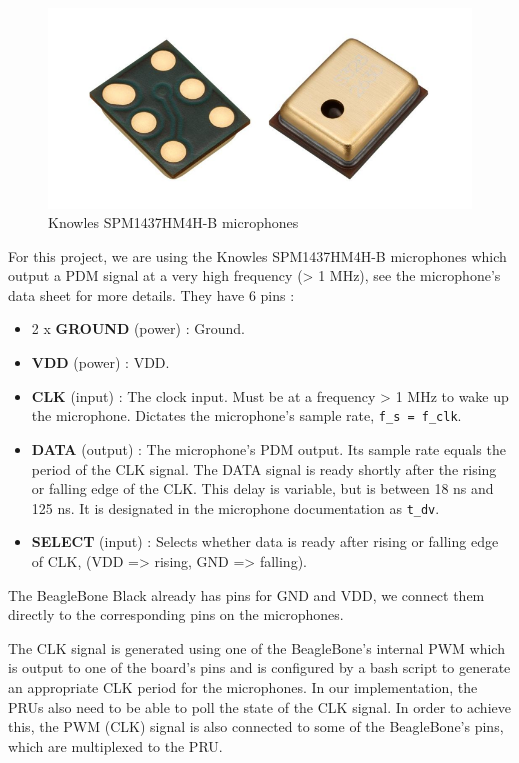 \documentclass[]{report}
\providecommand{\tightlist}{%
	\setlength{\itemsep}{0pt}\setlength{\parskip}{0pt}}
\begin{document}
\begin{figure}[H]
\centering
\includegraphics[width=0.6\linewidth]{Pictures/mics.png}
\caption{Knowles SPM1437HM4H-B microphones}
\end{figure}

For this project, we are using the Knowles SPM1437HM4H-B microphones
which output a PDM signal at a very high frequency (\textgreater{} 1
MHz), see the microphone's data sheet for more
details. They have 6 pins :

\begin{itemize}
\tightlist
\item
  2 x \textbf{GROUND} (power) : Ground.
\item
  \textbf{VDD} (power) : VDD.
\item
  \textbf{CLK} (input) : The clock input. Must be at a frequency
  \textgreater{} 1 MHz to wake up the microphone. Dictates the
  microphone's sample rate, \texttt{f\_s\ =\ f\_clk}.
\item
  \textbf{DATA} (output) : The microphone's PDM output. Its sample rate
  equals the period of the CLK signal. The DATA signal is ready shortly
  after the rising or falling edge of the CLK. This delay is variable,
  but is between 18 ns and 125 ns. It is designated in the microphone documentation
  as \texttt{t\_dv}.
\item
  \textbf{SELECT} (input) : Selects whether data is ready after rising
  or falling edge of CLK, (VDD =\textgreater{} rising, GND
  =\textgreater{} falling).
\end{itemize}

The BeagleBone Black already has pins for GND and VDD, we connect them directly to the corresponding pins on the microphones.

The CLK signal is generated using one of the BeagleBone's internal PWM which is output to one of the board's pins and is configured by a bash script to generate an appropriate CLK period for the microphones. In our implementation, the PRUs also need to be able to poll the state of the CLK signal. In order to achieve this, the PWM (CLK) signal is also connected to some of the BeagleBone's pins, which are multiplexed to the PRU.
\end{document}
